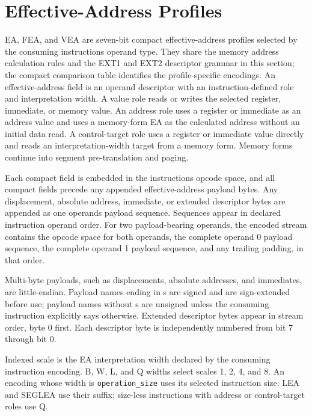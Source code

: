 \clearpage
\section{Effective-Address Profiles}\label{page:effective-addressing-modes}

EA, FEA, and VEA are seven-bit compact effective-address profiles selected by the consuming instruction\textquotesingle{}s operand
type. They share the memory address calculation rules and the EXT1 and EXT2 descriptor grammar in this section;
the compact comparison table identifies the profile-specific encodings. An effective-address field is an operand
descriptor with an instruction-defined role and interpretation width. A
value role reads or writes the selected register, immediate, or memory value. An address role uses a register or
immediate as an address value and uses a memory-form EA as the calculated address without an initial data read. A
control-target role uses a register or immediate value directly and reads an interpretation-width target from a
memory form. Memory forms continue into segment pre-translation and paging.

Each compact field is embedded in the instruction\textquotesingle{}s opcode space, and all compact fields precede any appended
effective-address payload bytes. Any displacement, absolute address, immediate, or extended
descriptor bytes are appended as one operand\textquotesingle{}s payload sequence. Sequences appear in declared instruction operand
order. For two payload-bearing operands, the encoded stream contains the opcode space for both operands, the complete
operand 0 payload sequence, the complete operand 1 payload sequence, and any trailing padding, in that order.

Multi-byte payloads, such as displacements, absolute addresses, and immediates, are little-endian. Payload
names ending in s are signed and are sign-extended before use; payload names without s are unsigned unless the
consuming instruction explicitly says otherwise. Extended descriptor bytes appear in stream order, byte 0 first. Each
descriptor byte is independently numbered from bit 7 through bit 0.

Indexed scale is the EA interpretation width declared by the consuming instruction encoding. B, W, L, and Q widths select scales 1,
2, 4, and 8. An encoding whose width is \texttt{operation\_size} uses its selected instruction size. LEA and SEGLEA use
their suffix; size-less instructions with address or control-target roles use Q.

